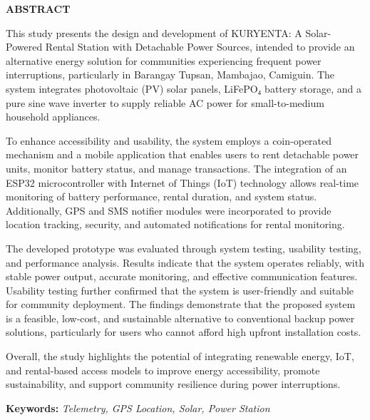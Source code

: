 \begin{center}
{\bf ABSTRACT}\\[36pt]
\end{center}
{\baselineskip

This study presents the design and development of KURYENTA: A Solar-Powered Rental Station with Detachable Power Sources, intended to provide an alternative energy solution for communities experiencing frequent power interruptions, particularly in Barangay Tupsan, Mambajao, Camiguin. The system integrates photovoltaic (PV) solar panels, LiFePO₄ battery storage, and a pure sine wave inverter to supply reliable AC power for small-to-medium household appliances.

To enhance accessibility and usability, the system employs a coin-operated mechanism and a mobile application that enables users to rent detachable power units, monitor battery status, and manage transactions. The integration of an ESP32 microcontroller with Internet of Things (IoT) technology allows real-time monitoring of battery performance, rental duration, and system status. Additionally, GPS and SMS notifier modules were incorporated to provide location tracking, security, and automated notifications for rental monitoring.

The developed prototype was evaluated through system testing, usability testing, and performance analysis. Results indicate that the system operates reliably, with stable power output, accurate monitoring, and effective communication features. Usability testing further confirmed that the system is user-friendly and suitable for community deployment. The findings demonstrate that the proposed system is a feasible, low-cost, and sustainable alternative to conventional backup power solutions, particularly for users who cannot afford high upfront installation costs.

Overall, the study highlights the potential of integrating renewable energy, IoT, and rental-based access models to improve energy accessibility, promote sustainability, and support community resilience during power interruptions.

}
\bigskip
\textbf{Keywords:} \textit{Telemetry, GPS Location, Solar, Power Station}
